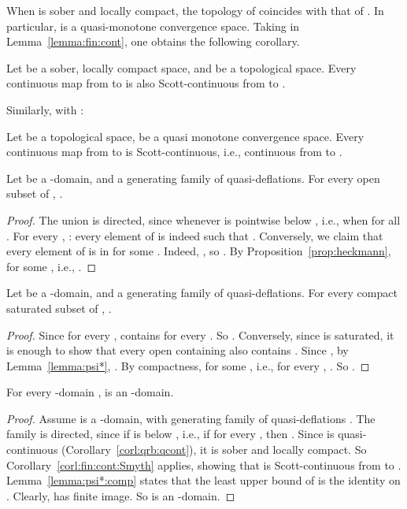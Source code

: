 \documentclass{LMCS}
\begin{document}
When  is sober and locally compact, the topology of  coincides with that of .  In particular, 
is a quasi-monotone convergence space.  Taking  in
Lemma~\ref{lemma:fin:cont}, one obtains the following corollary.
\begin{cor}
  \label{corl:fin:cont:Smyth}
  Let  be a sober, locally compact space, and  be a topological
  space.  Every continuous map from  to  is also
  Scott-continuous from  to .
\end{cor}
Similarly, with :
\begin{cor}
  \label{corl:fin:cont:Fin}
  Let  be a topological space,  be a quasi monotone convergence
  space.  Every continuous map from  to  is
  Scott-continuous, i.e., continuous from  to .
\end{cor}

\begin{lem}
  \label{lemma:psi*}
  Let  be a -domain, and  a
  generating family of quasi-deflations.  For every open subset  of
  , .
\end{lem}
\begin{proof}
  The union is directed, since  whenever  is pointwise below
  , i.e., when  for all .  For every , : every element  of  is
  indeed such that .  Conversely, we
  claim that every element  of  is in 
  for some .  Indeed, , so .  By
  Proposition~\ref{prop:heckmann},  for
  some , i.e., .
\end{proof}

\begin{lem}
  \label{lemma:psi*:comp}
  Let  be a -domain, and  a
  generating family of quasi-deflations.  For every compact saturated
  subset  of , .
\end{lem}
\begin{proof}
  Since  for every
  ,  contains  for every .  So .
  Conversely, since  is saturated, it is enough to show that every
  open  containing  also contains .  Since , by
  Lemma~\ref{lemma:psi*}, .  By compactness,  for some , i.e., for every , .  So .
\end{proof}

\begin{prop}
  \label{prop:qrb:Smyth}
  For every -domain ,  is an -domain.
\end{prop}
\begin{proof}
  Assume  is a -domain, with generating family of
  quasi-deflations .  The family
   is directed, since if 
  is below , i.e., if  for every , then .  Since  is quasi-continuous
  (Corollary~\ref{corl:qrb:qcont}), it is sober and locally compact.
  So Corollary~\ref{corl:fin:cont:Smyth} applies, showing that
   is Scott-continuous from  to .  Lemma~\ref{lemma:psi*:comp} states that the least upper bound
  of  is the identity on .  Clearly,  has finite image.  So  is an -domain.
\end{proof}
\end{document}
